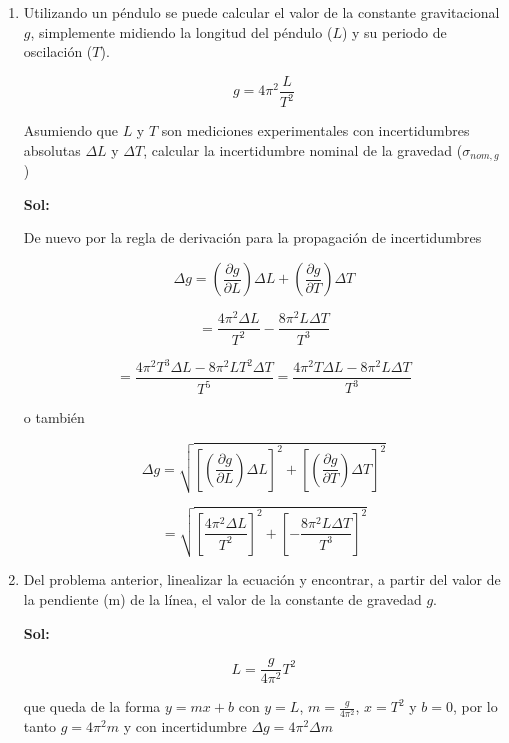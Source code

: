 \documentclass[12pt,a4paper]{article}
\begin{document}
\begin{enumerate}



\item Utilizando un péndulo se puede calcular el valor de la constante gravitacional $g$, simplemente midiendo la longitud del péndulo ($L$) y su periodo de oscilación ($T$).

\begin{equation*}
    g = 4 \pi^2 \frac{L}{T^2}
\end{equation*}

Asumiendo que $L$ y $T$ son mediciones experimentales con incertidumbres absolutas $\Delta L$ y $\Delta T$, calcular la incertidumbre nominal de la gravedad ($\sigma_{nom,g}$)

\textbf{Sol:}

De nuevo por la regla de derivación para la propagación de incertidumbres

\begin{equation*}
    \Delta g = \left(\frac{\partial g}{\partial L}\right) \Delta L + \left( \frac{\partial g}{\partial T} \right) \Delta T
\end{equation*}

\begin{equation*}
    = \frac{4 \pi^2 \Delta L}{T^2}  - \frac{8 \pi^2 L \Delta T}{T^3}
\end{equation*}

\begin{equation*}
    =\frac{4 \pi^2 T^3 \Delta L - 8 \pi^2 L T^2 \Delta T}{T^5} = \frac{4 \pi^2 T \Delta L - 8 \pi^2 L \Delta T}{T^3}
\end{equation*}

o también

\begin{equation*}
    \Delta g = \sqrt{\left[\left(\frac{\partial g}{\partial L}\right) \Delta L\right]^2 + \left[\left(\frac{\partial g}{\partial T}\right) \Delta T\right]^2}
\end{equation*}

\begin{equation*}
    = \sqrt{\left[\frac{4 \pi^2 \Delta L}{T^2}\right]^2 + \left[-\frac{8 \pi^2 L \Delta T}{T^3}\right]^2}
\end{equation*}







\item Del problema anterior, linealizar la ecuación y encontrar, a partir del valor de la pendiente (m) de la línea, el valor de la constante de gravedad $g$.

\textbf{Sol:}

\begin{equation*}
    L = \frac{g}{4 \pi^2} T^2
\end{equation*}

que queda de la forma $y = mx + b$ con $y = L$, $m = \frac{g}{4\pi^2}$, $x = T^2$ y $b = 0$, por lo tanto $g = 4 \pi^2 m$ y con incertidumbre $\Delta g = 4 \pi^2 \Delta m$
    
\end{enumerate}
\end{document}
